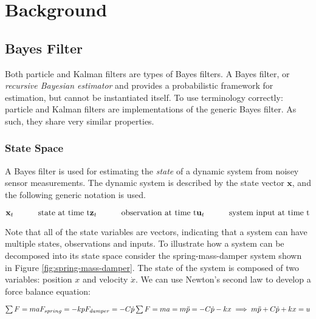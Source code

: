 \section{Background}

\subsection{Bayes Filter}
Both particle and Kalman filters are types of Bayes filters. A Bayes filter,
or \emph{recursive Bayesian estimator} and provides a probabilistic framework
for estimation, but cannot be instantiated itself. To use terminology correctly:
particle and Kalman filters are implementations of the generic Bayes filter. As
such, they share very similar properties.

\subsubsection{State Space}
A Bayes filter is used for estimating the \emph{state} of a dynamic system from
noisey sensor measurements. The dynamic system is described by the state
vector $\textbf{x}$, and the following generic notation is used.

\begin{math}
\mathbf{x}_{t}\quad\quad\quad\textrm{state at time t} \\
\mathbf{z}_{t}\quad\quad\quad\textrm{observation at time t} \\
\mathbf{u}_{t}\quad\quad\quad\textrm{system input at time t}
\end{math}

Note that all of the state variables are vectors, indicating that a system can
have multiple states, observations and inputs. To illustrate how a system can be
decomposed into its state space consider the spring-mass-damper system shown in
Figure \ref{fig:spring-mass-damper}. The state of the system is composed of two
variables: position $x$ and velocity $\dot{x}$. We can use Newton's second law
to develop a force balance equation:

\begin{math}
\sum{F} = ma \\\\
F_{spring} = -kp \\
F_{damper} = -C\dot{p} \\\\
\sum{F} = ma = m\ddot{p} = -C\dot{p} -kx \\\\
\implies m\ddot{p} + C\dot{p} + kx = u
\end{math}

